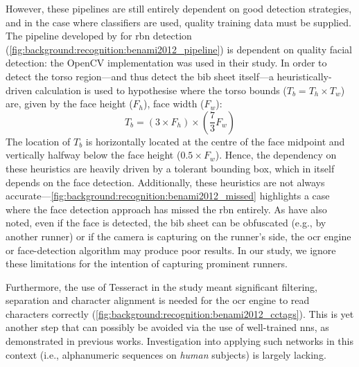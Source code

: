 However, these pipelines are still entirely dependent on good detection strategies, and in the case where classifiers are used, quality training data must be supplied. The pipeline developed by \citet{Benami:2012jf} for \gls{rbn} detection (\cref{fig:background:recognition:benami2012_pipeline}) is dependent on quality facial detection: the OpenCV implementation \citep{Lienhart:2002uo} was used in their study. In order to detect the torso region---and thus detect the bib sheet itself---a heuristically-driven calculation is used to hypothesise where the torso bounds ($T_{b} = T_{h} \times T_{w}$) are, given by the face height ($F_{h}$), face width ($F_{w}$):
\begin{equation*}
  T_{b} = (3 \times F_{h}) \times (\frac{7}{3} F_{w})
\end{equation*}
The location of $T_{b}$ is horizontally located at the centre of the face midpoint and vertically halfway below the face height ($0.5 \times F_{w}$). Hence, the dependency on these heuristics are heavily driven by a tolerant bounding box, which in itself depends on the face detection. Additionally, these heuristics are not always accurate---\cref{fig:background:recognition:benami2012_missed} highlights a case where the face detection approach has missed the \gls{rbn} entirely. As \citet{Fu:2015by} have also noted, even if the face is detected, the bib sheet can be obfuscated (e.g., by another runner) or if the camera is capturing on the runner's side, the \gls{ocr} engine or face-detection algorithm may produce poor results. In our study, we ignore these limitations for the intention of capturing prominent runners.

Furthermore, the use of Tesseract in the study meant significant filtering, separation and character alignment is needed for the \gls{ocr} engine to read characters correctly (\cref{fig:background:recognition:benami2012_cctags}). This is yet another step that can possibly be avoided via the use of well-trained \glspl{nn}, as demonstrated in previous works. Investigation into applying such networks in this context (i.e., alphanumeric sequences on \textit{human} subjects) is largely lacking.

\vspace*{\fill}

